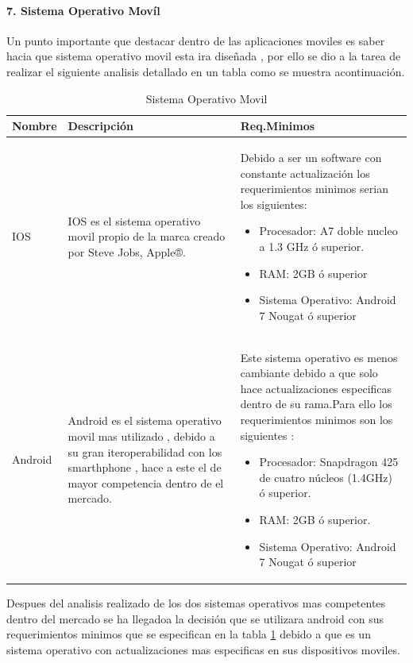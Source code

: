 \paragraph{7. Sistema Operativo Movíl} 

Un punto importante que destacar dentro de las aplicaciones moviles es saber hacia que sistema operativo movil esta ira diseñada , por ello se dio a la tarea de realizar el siguiente analisis detallado en un tabla como se muestra acontinuación.
\begin{table}[h!]
\begin{tabular}{|p{2cm}|p{6cm}|p{6cm}|}
\hline
\textbf{Nombre}&\textbf{Descripción}&\textbf{Req.Minimos}\\
\hline
\hline
IOS & IOS es el sistema operativo movil propio de la marca creado por Steve Jobs, Apple®. & Debido a ser un software con constante actualización los requerimientos minimos serian los siguientes: \begin{itemize}
				\item Procesador: A7 doble nucleo a 1.3 GHz ó superior.
				\item RAM: 2GB ó superior
				\item Sistema Operativo: Android 7 Nougat ó superior
				\end{itemize} \\
\hline
\hline
Android & Android es el sistema operativo movil mas utilizado , debido a su gran iteroperabilidad con los smarthphone , hace a este el de mayor competencia dentro de el mercado. & Este sistema operativo es menos cambiante debido a que solo hace actualizaciones especificas dentro de su rama.Para ello los requerimientos minimos son los siguientes : 
\begin{itemize}
				\item Procesador: Snapdragon 425 de cuatro núcleos (1.4GHz) ó superior.
				\item RAM: 2GB ó superior.
				\item Sistema Operativo: Android 7 Nougat ó superior
				\end{itemize} \\
\hline
\end{tabular}
\caption{Sistema Operativo Movil}
\label{disenoEstructura:SOMovil}
\end{table}

Despues del analisis realizado de los dos sistemas operativos mas competentes dentro del mercado se ha llegadoa  la decisión que se utilizara android con sus requerimientos minimos que se especifican en la tabla \ref{disenoEstructura:SOMovil} debido a que es un sistema operativo con actualizaciones mas especificas en sus dispositivos moviles.

